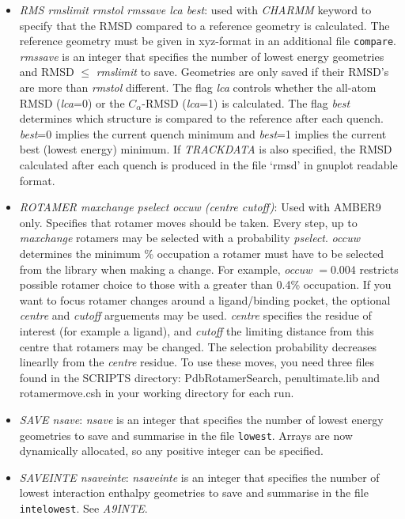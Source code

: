 \documentclass[12pt,a4paper,dvips]{article}
\begin{document}
\begin{itemize}
\item{\it RMS rmslimit rmstol rmssave lca best}: used with {\it CHARMM} keyword to
specify that the RMSD compared to a reference geometry is calculated. The reference geometry must 
be given in xyz-format in an additional file {\tt compare}. {\it rmssave} is an integer 
that specifies the number of lowest energy geometries and RMSD $\le$ {\it rmslimit}
to save. Geometries are only saved if their RMSD's are more than {\it rmstol} 
different. The flag {\it lca} controls whether the all-atom RMSD ({\it lca}=0) or the $C_{\alpha}$-RMSD 
({\it lca}=1) is calculated. The flag {\it best} determines which structure is compared to the reference
after each quench. {\it best}=0 implies the current quench minimum and {\it best}=1 implies the current best (lowest energy) minimum. If {\it TRACKDATA} is also specified, the RMSD calculated after each quench is produced in the file `rmsd' in gnuplot readable format.

\item {\it ROTAMER maxchange pselect occuw (centre cutoff)\/}: Used with AMBER9 only. Specifies that rotamer moves should be taken. Every step, up to {\it maxchange} rotamers may be selected with a probability {\it pselect}. {\it occuw} determines the minimum \% occupation a rotamer must have to be selected from the library\cite{lovelljm00} when making a change. For example, {\it occuw} $= 0.004$ restricts possible rotamer choice to those with a greater than 0.4\% occupation. If you want to focus rotamer changes around a ligand/binding pocket, the optional {\it centre} and {\it cutoff} arguements may be used. {\it centre} specifies the residue of interest (for example a ligand), and {\it cutoff} the limiting distance from this centre that rotamers may be changed. The selection probability decreases linearlly from the {\it centre} residue. To use these moves, you need three files found in the SCRIPTS directory: PdbRotamerSearch, penultimate.lib and rotamermove.csh in your working directory for each run. 

\item {\it SAVE nsave\/}: {\it nsave\/} is an integer that specifies the number of lowest
energy geometries to save and summarise in the file {\tt lowest}. 
Arrays are now dynamically allocated, so any positive integer can be specified.

\item {\it SAVEINTE nsaveinte\/}: {\it nsaveinte\/} is an integer that specifies the number of lowest
interaction enthalpy geometries to save and summarise in the file {\tt intelowest}. See {\it A9INTE\/}. 


\end{itemize}
\end{document}
